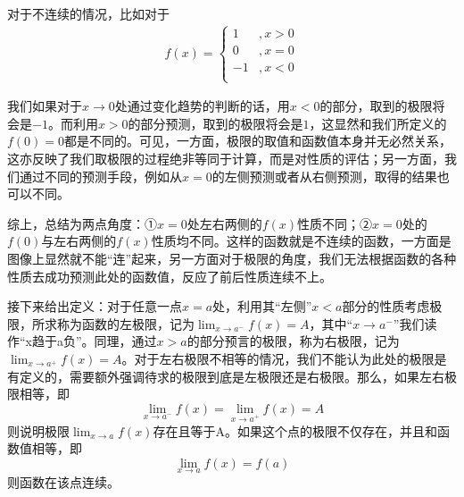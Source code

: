 \documentclass[fontset=none]{ctexart}
\begin{document}
    对于不连续的情况，比如对于
    \begin{equation}
        \begin{split}f(x)=
            \begin{cases}
                1&,x>0\\
                0&,x=0\\
                -1&,x<0\\
            \end{cases}
        \end{split}
    \end{equation} 
    
    我们如果对于$x\to 0$处通过变化趋势的判断的话，用$x<0$的部分，取到的极限将会是$-1$。而利用$x>0$的部分预测，取到的极限将会是$1$，这显然和我们所定义的$f(0)=0$都是不同的。可见，一方面，极限的取值和函数值本身并无必然关系，这亦反映了我们取极限的过程绝非等同于计算，而是对性质的评估；另一方面，我们通过不同的预测手段，例如从$x=0$的左侧预测或者从右侧预测，取得的结果也可以不同。

    综上，总结为两点角度：①$x=0$处左右两侧的$f(x)$性质不同；②$x=0$处的$f(0)$与左右两侧的$f(x)$性质均不同。这样的函数就是不连续的函数，一方面是图像上显然就不能“连”起来，另一方面对于极限的角度，我们无法根据函数的各种性质去成功预测此处的函数值，反应了前后性质连续不上。

    接下来给出定义：对于任意一点$x=a$处，利用其“左侧”$x<a$部分的性质考虑极限，所求称为函数的左极限，记为$\lim_{x\to a^-}f(x)=A$，其中“$x\to a^-$”我们读作“x趋于a负”。同理，通过$x>a$的部分预言的极限，称为右极限，记为$\lim_{x\to a^+}f(x)=A$。对于左右极限不相等的情况，我们不能认为此处的极限是有定义的，需要额外强调待求的极限到底是左极限还是右极限。那么，如果左右极限相等，即$$\lim_{x\to a^-}f(x)=\lim_{x\to a^+}f(x)=A$$则说明极限$\lim_{x\to a}f(x)$存在且等于A。如果这个点的极限不仅存在，并且和函数值相等，即$$\lim_{x\to a}f(x)=f(a)$$则函数在该点连续。
\end{document}
